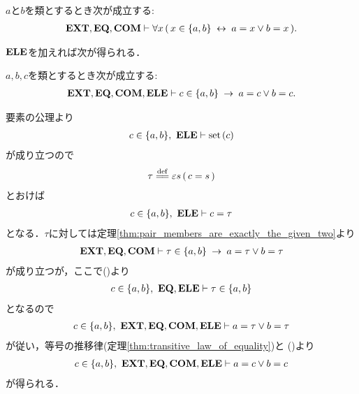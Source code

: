	\begin{screen}
		\begin{thm}[対は表示されている要素しか持たない]
		\label{thm:pair_members_are_exactly_the_given_two}
			$a$と$b$を類とするとき次が成立する:
			\begin{align}
				\mbox{{\bf EXT}},\mbox{{\bf EQ}},\mbox{\bf COM} \vdash 
				\forall x\, (\, x \in \{a,b\} \hspace{0.25em}\leftrightarrow\hspace{0.25em} a = x \vee b = x\, ).
			\end{align}
		\end{thm}
	\end{screen}
	
	$\mbox{{\bf ELE}}$を加えれば次が得られる．
	
	\begin{screen}
		\begin{thm}[対の要素は表示されている要素の一方には等しい]
		\label{cor:pair_members_are_exactly_the_given_two}
			$a,b,c$を類とするとき次が成立する:
			\begin{align}
				\mbox{{\bf EXT}},\mbox{{\bf EQ}},\mbox{\bf COM},\mbox{{\bf ELE}} \vdash 
				c \in \{a,b\} \hspace{0.25em}\rightarrow\hspace{0.25em} a = c \vee b = c.
			\end{align}
		\end{thm}
	\end{screen}
	
	\begin{sketch}
		要素の公理より
		\begin{align}
			c \in \{a,b\},\ \mbox{{\bf ELE}} \vdash \operatorname*{set}\hspace{0.15em}(c)
		\end{align}
		が成り立つので
		\begin{align}
			\tau \defeq \varepsilon s\, (\, c = s\, )
		\end{align}
		とおけば
		\begin{align}
			c \in \{a,b\},\ \mbox{{\bf ELE}} \vdash c = \tau
			\label{fom:pair_members_are_exactly_the_given_two_2}
		\end{align}
		となる．$\tau$に対しては定理\ref{thm:pair_members_are_exactly_the_given_two}より 
		\begin{align}
			\mbox{{\bf EXT}},\mbox{{\bf EQ}},\mbox{\bf COM} \vdash 
			\tau \in \{a,b\} \hspace{0.25em}\rightarrow\hspace{0.25em} a = \tau \vee b = \tau
		\end{align}
		が成り立つが，ここで()より
		\begin{align}
			c \in \{a,b\},\ \mbox{{\bf EQ}},\mbox{{\bf ELE}} \vdash \tau \in \{a,b\}
		\end{align}
		となるので
		\begin{align}
			c \in \{a,b\},\ \mbox{{\bf EXT}},\mbox{{\bf EQ}},\mbox{\bf COM},\mbox{{\bf ELE}} \vdash a = \tau \vee b = \tau
		\end{align}
		が従い，等号の推移律(定理\ref{thm:transitive_law_of_equality})と
		()より
		\begin{align}
			c \in \{a,b\},\ \mbox{{\bf EXT}},\mbox{{\bf EQ}},\mbox{\bf COM},\mbox{{\bf ELE}} \vdash a = c \vee b = c
		\end{align}
		が得られる．
		\QED
	\end{sketch}
	
